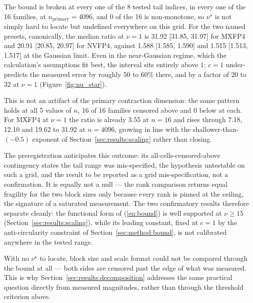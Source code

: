 The bound is broken at every one of the 8 tested tail indices, in every one of
the 16 families, at $n_{\mathrm{primary}} = 4096$, and 0 of the 16 is
non-monotone, so $\nu^\star$ is not simply hard to locate but undefined
everywhere on this grid. For the two named presets, canonically, the median ratio
at $\nu = 1$ is 31.92 [31.85, 31.97] for MXFP4 and 20.91 [20.85, 20.97] for
NVFP4, against 1.588 [1.585, 1.590] and 1.515 [1.513, 1.517] at the Gaussian
limit. Even in the near-Gaussian regime, which the calculation's assumptions fit
best, the interval sits entirely above $1$: $c = 1$ under-predicts the measured
error by roughly 50 to 60\% there, and by a factor of 20 to 32 at $\nu = 1$
(Figure~\ref{fig:nu_star}).

This is not an artifact of the primary contraction dimension: the same pattern
holds at all 5 values of $n$, 16 of 16 families censored above and 0 below at
each. For MXFP4 at $\nu = 1$ the ratio is already 3.55 at $n = 16$ and rises
through 7.18, 12.10 and 19.62 to 31.92 at $n = 4096$, growing in line with the
shallower-than-$(-0.5)$ exponent of Section~\ref{sec:results:scaling} rather than
closing.

The preregistration anticipates this outcome: its all-cells-censored-above
contingency states the tail range was mis-specified, the hypothesis untestable on
such a grid, and the result to be reported as a grid mis-specification, not a
confirmation. It is equally not a null --- the rank comparison returns equal
fragility for the two block sizes only because every rank is pinned at the
ceiling, the signature of a saturated measurement. The two confirmatory results
therefore separate cleanly: the functional form of (\ref{eq:bound}) is well
supported at $\nu \ge 15$ (Section~\ref{sec:results:scaling}), while its leading
constant, fixed at $c = 1$ by the anti-circularity constraint of
Section~\ref{sec:method:bound}, is not calibrated anywhere in the tested range.

 With no $\nu^\star$ to locate, block size and scale format could not
be compared through the bound at all --- both sides are censored past the edge of
what was measured. This is why Section~\ref{sec:results:decomposition} addresses
the same practical question directly from measured magnitudes, rather than
through the threshold criterion above.
